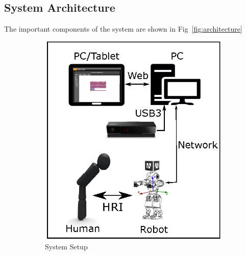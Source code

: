 \documentclass{llncs}
\begin{document}
\subsection{System Architecture}
The important components of the system are shown in Fig~\ref{fig:architecture}
\begin{figure}
\centering
\begin{subfigure}[t]{0.46\textwidth}
\includegraphics[width=\textwidth]{../thesis/assets/system_setup.eps}
\caption[System Setup]{System Setup}
\end{subfigure}
\begin{subfigure}[t]{0.48\textwidth}

\end{subfigure}
\end{figure}
\end{document}
